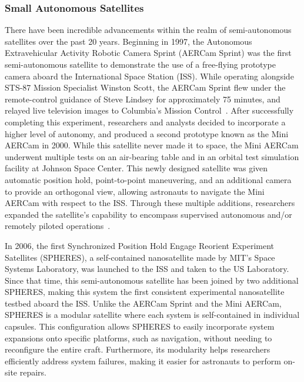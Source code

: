 \documentclass[paper=letter, fontsize=11pt]{scrartcl} %
\numberwithin{equation}{section} %
\numberwithin{figure}{section} %
\numberwithin{table}{section} %
\begin{document}
\subsubsection{Small Autonomous Satellites}
There have been incredible advancements within the realm of semi-autonomous satellites over the past 20 years. Beginning in 1997, the Autonomous Extravehicular Activity Robotic Camera Sprint (AERCam Sprint) was the first semi-autonomous satellite to demonstrate the use of a free-flying prototype camera aboard the International Space Station (ISS). While operating alongside STS-87 Mission Specialist Winston Scott, the AERCam Sprint flew under the remote-control guidance of Steve Lindsey for approximately 75 minutes, and relayed live television images to Columbia's Mission Control~\cite{Aercam,MiniAercam}. After successfully completing this experiment, researchers and analysts decided to incorporate a higher level of autonomy, and produced a second prototype known as the Mini AERCam in 2000. While this satellite never made it to space, the Mini AERCam underwent multiple tests on an air-bearing table and in an orbital test simulation facility at Johnson Space Center. This newly designed satellite was given automatic position hold, point-to-point maneuvering, and an additional camera to provide an orthogonal view, allowing astronauts to navigate the Mini AERCam with respect to the ISS. Through these multiple additions, researchers expanded the satellite's capability to encompass supervised autonomous and/or remotely piloted operations~\cite{MiniAercam,MiniAercam2}.

In 2006, the first Synchronized Position Hold Engage Reorient Experiment Satellites (SPHERES), a self-contained nanosatellite made by MIT's Space Systems Laboratory, was launched to the ISS and taken to the US Laboratory. Since that time, this semi-autonomous satellite has been joined by two additional SPHERES, making this system the first consistent experimental nanosatellite testbed aboard the ISS. Unlike the AERCam Sprint and the Mini AERCam, SPHERES is a modular satellite where each system is self-contained in individual capsules. This configuration allows SPHERES to easily incorporate system expansions onto specific platforms, such as navigation, without needing to reconfigure the entire craft. Furthermore, its modularity helps researchers efficiently address system failures, making it easier for astronauts to perform on-site repairs.
\end{document}
